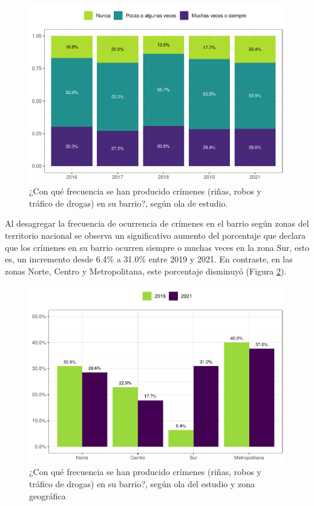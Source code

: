 \documentclass[
  12pt,
]{book}
\begin{document}
\begin{figure}

{\centering \includegraphics{reporte-elsoc_files/figure-latex/crim-olas-1} 

}

\caption{¿Con qué frecuencia se han producido crímenes (riñas, robos y tráfico de drogas) en su barrio?, según ola de estudio.}\label{fig:crim-olas}
\end{figure}

Al desagregar la frecuencia de ocurrencia de crímenes en el barrio según zonas del territorio nacional se observa un significativo aumento del porcentaje que declara que los crímenes en su barrio ocurren siempre o muchas veces en la zona Sur, esto es, un incremento desde 6.4\% a 31.0\% entre 2019 y 2021. En contraste, en las zonas Norte, Centro y Metropolitana, este porcentaje disminuyó (Figura \ref{fig:crim-zona}).

\begin{figure}

{\centering \includegraphics{reporte-elsoc_files/figure-latex/crim-zona-1} 

}

\caption{¿Con qué frecuencia se han producido crímenes (riñas, robos y tráfico de drogas) en su barrio?, según ola del estudio y zona geográfica}\label{fig:crim-zona}
\end{figure}
\end{document}
